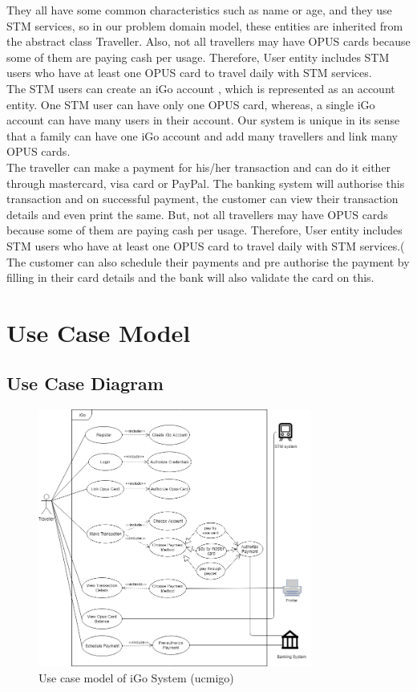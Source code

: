 \documentclass[11pt, english]{article}
\begin{document}
They all have some common characteristics such as name or age, and they use STM services, so in our problem domain model, these entities are inherited from the abstract class Traveller. Also, not all travellers may have OPUS cards because some of them are paying cash per usage. Therefore, User entity includes STM users who have at least one OPUS card to travel daily with STM services.\\

The STM users can create an iGo account , which is represented as an account entity. One STM user can have only one OPUS card, whereas, a single iGo account can have many users in their account. Our system is unique in its sense that a family can have one iGo account and add many travellers and link many OPUS cards. \\

The traveller can make a payment for his/her transaction and can do it either through mastercard, visa card or PayPal. The banking system will authorise this transaction and on successful payment, the customer can view their transaction details and even print the same. But, not all travellers may have OPUS cards because some of them are paying cash per usage. Therefore, User entity includes STM users who have at least one OPUS card to travel daily with STM services.(
The customer can also schedule their payments and pre authorise the payment by filling in their card details and the bank will also validate the card on this. \\

\section{Use Case Model }
\subsection{Use Case Diagram}
 \begin{figure}[H]
  
  \includegraphics[width=0.8\textwidth]{usecase_model.png}
  \centering
  \caption{Use case model of iGo System (\gls{ucmigo})}

\end{figure}
\end{document}
